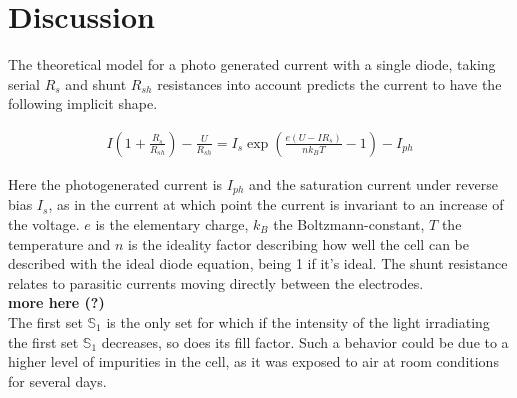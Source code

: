
\section{Discussion}\label{sec:discussion}
The theoretical model for a photo generated current with a single diode, taking serial $R_s$ and shunt $R_{sh}$ resistances into account predicts the current to have the following implicit shape.\cite{source10}

\begin{align}
I\left(1+\frac{R_s}{R_{sh}}\right)-\frac{U}{R_{sh}} = I_s\exp\left(\frac{e(U-I R_s)}{n k_B T}-1\right)-I_{ph}
\end{align}

Here the photogenerated current is $I_{ph}$ and the saturation current under reverse bias $I_s$, as in the current at which point the current is invariant to an increase of the voltage. $e$ is the elementary charge, $k_B$ the Boltzmann-constant, $T$ the temperature and $n$ is the ideality factor describing how well the cell can be described with the ideal diode equation, being 1 if it's ideal. The shunt resistance relates to parasitic currents moving directly between the electrodes\cite{source11}.
\\\textbf{more here (?)}\\
The first set $\mathbb{S}_1$ is the only set for which if the intensity of the light irradiating the first set $\mathbb{S}_1$ decreases, so does its fill factor. Such a behavior could be due to a higher level of impurities in the cell, as it was exposed to air at room conditions for several days.


